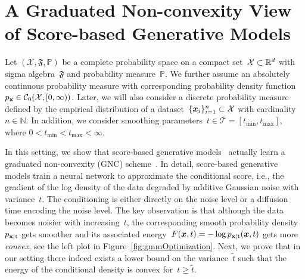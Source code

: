 \documentclass{article}
\newcommand{\N}{\mathbb{N}}
\renewcommand{\P}{\mathbb{P}}
\newcommand{\C}{\mathcal{C}}
\newcommand{\X}{\mathcal{X}}
\newcommand{\T}{\mathcal{T}}
\newcommand{\tmin}{t_\mathrm{min}}
\newcommand{\tmax}{t_\mathrm{max}}
\newcommand{\pdf}[1]{p_{#1}}
\theoremstyle{plain}
\theoremstyle{definition}
\theoremstyle{remark}
\begin{document}




\section{A Graduated Non-convexity View of Score-based Generative Models} \label{sec:gnc}
Let $(\X,\mathfrak{F},\P)$ be a complete probability space on a compact set~$\X\subset\R^d$ with sigma algebra~$\mathfrak{F}$ and probability measure~$\P$.
We further assume an absolutely continuous probability measure with corresponding probability density function~$\pdf{\rvx}\in \C_0(\X,[0,\infty))$.
Later, we will also consider a discrete probability measure defined by the empirical distribution of a dataset~$\{\vx_i\}_{i=1}^n\subset\X$ with cardinality~$n\in\N$.
In addition, we consider smoothing parameters~$t\in\T=[\tmin,\tmax]$, where $0<\tmin<\tmax<\infty$.

In this setting, we show that score-based generative models~\citep{SoEr19,HoJa20} actually learn a graduated non-convexity (GNC) scheme~\citep{BlZi87}.
In detail,  score-based generative models train a neural network to approximate the conditional score, i.e., the gradient of the log density of the data degraded by additive Gaussian noise with variance~$t$.
The conditioning is either directly on the noise level or a diffusion time encoding the noise level.
The key observation is that although the data becomes noisier with increasing~$t$, the corresponding smooth probability density~$\pdf{\rvx\vert\rt}$ gets smoother and its associated energy~$F(\vx,t)=-\log\pdf{\rvx\vert\rt}(\vx,t)$ gets more \emph{convex}, see the left plot in Figure~\ref{fig:gmmOptimization}.
Next, we prove that in our setting there indeed exists a lower bound on the variance~$\widetilde{t}$ such that the energy of the conditional density is convex for~$t\geq\widetilde{t}$.
\end{document}
